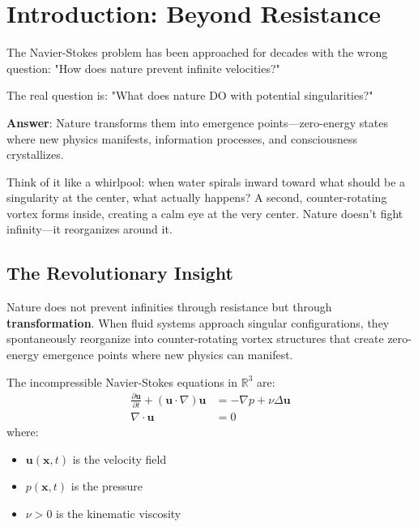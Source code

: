 \section{Introduction: Beyond Resistance}

\begin{intuitive}
The Navier-Stokes problem has been approached for decades with the wrong question: "How does nature prevent infinite velocities?"

The real question is: "What does nature DO with potential singularities?"

\textbf{Answer}: Nature transforms them into emergence points—zero-energy states where new physics manifests, information processes, and consciousness crystallizes.

Think of it like a whirlpool: when water spirals inward toward what should be a singularity at the center, what actually happens? A second, counter-rotating vortex forms inside, creating a calm eye at the very center. Nature doesn't fight infinity—it reorganizes around it.
\end{intuitive}

\subsection{The Revolutionary Insight}

\begin{keyidea}
Nature does not prevent infinities through resistance but through \textbf{transformation}. When fluid systems approach singular configurations, they spontaneously reorganize into counter-rotating vortex structures that create zero-energy emergence points where new physics can manifest.
\end{keyidea}

\begin{defn}\label{def:navier-stokes}
The incompressible Navier-Stokes equations in $\mathbb{R}^3$ are\cite{temam2001,fefferman2000}:
\begin{align}
\frac{\partial \mathbf{u}}{\partial t} + (\mathbf{u} \cdot \nabla)\mathbf{u} &= -\nabla p + \nu \Delta \mathbf{u} \\
\nabla \cdot \mathbf{u} &= 0
\end{align}
where:
\begin{itemize}
\item $\mathbf{u}(\mathbf{x}, t)$ is the velocity field
\item $p(\mathbf{x}, t)$ is the pressure
\item $\nu > 0$ is the kinematic viscosity
\end{itemize}
\end{defn}

